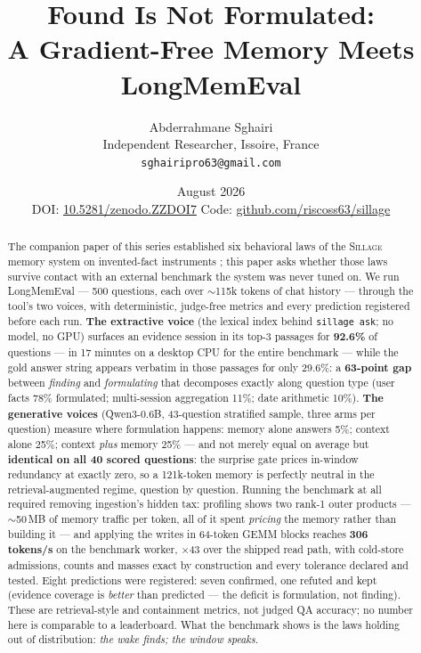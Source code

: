 \documentclass[11pt]{article}
\title{\bfseries Found Is Not Formulated:\\
A Gradient-Free Memory Meets LongMemEval}
\author{Abderrahmane Sghairi\\
\small Independent Researcher, Issoire, France\\
\small \texttt{sghairipro63@gmail.com}}
\date{August 2026\\[2pt]
\small DOI: \href{https://doi.org/10.5281/zenodo.ZZDOI7}{10.5281/zenodo.ZZDOI7}
\qquad Code: \href{https://github.com/riscoss63/sillage}{github.com/riscoss63/sillage}}
\newcommand{\sillage}{\textsc{Sillage}}
\begin{document}
\maketitle

\begin{abstract}
The companion paper of this series established six behavioral laws of the \sillage{} memory system on invented-fact instruments \cite{behavior}; this paper asks whether those laws survive contact with an external benchmark the system was never tuned on. We run LongMemEval \cite{longmemeval} --- 500 questions, each over $\sim$115k tokens of chat history --- through the tool's two voices, with deterministic, judge-free metrics and every prediction registered before each run. \textbf{The extractive voice} (the lexical index behind \texttt{sillage ask}; no model, no GPU) surfaces an evidence session in its top-3 passages for \textbf{92.6\%} of questions --- in 17 minutes on a desktop CPU for the entire benchmark --- while the gold answer string appears verbatim in those passages for only 29.6\%: a \textbf{63-point gap} between \emph{finding} and \emph{formulating} that decomposes exactly along question type (user facts 78\% formulated; multi-session aggregation 11\%; date arithmetic 10\%). \textbf{The generative voices} (Qwen3-0.6B, 43-question stratified sample, three arms per question) measure where formulation happens: memory alone answers 5\%; context alone 25\%; context \emph{plus} memory 25\% --- and not merely equal on average but \textbf{identical on all 40 scored questions}: the surprise gate prices in-window redundancy at exactly zero, so a 121k-token memory is perfectly neutral in the retrieval-augmented regime, question by question. Running the benchmark at all required removing ingestion's hidden tax: profiling shows two rank-1 outer products --- $\sim$50\,MB of memory traffic per token, all of it spent \emph{pricing} the memory rather than building it --- and applying the writes in 64-token GEMM blocks reaches \textbf{306 tokens/s} on the benchmark worker, $\times$43 over the shipped read path, with cold-store admissions, counts and masses exact by construction and every tolerance declared and tested. Eight predictions were registered: seven confirmed, one refuted and kept (evidence coverage is \emph{better} than predicted --- the deficit is formulation, not finding). These are retrieval-style and containment metrics, not judged QA accuracy; no number here is comparable to a leaderboard. What the benchmark shows is the laws holding out of distribution: \emph{the wake finds; the window speaks}.
\end{abstract}
\end{document}

